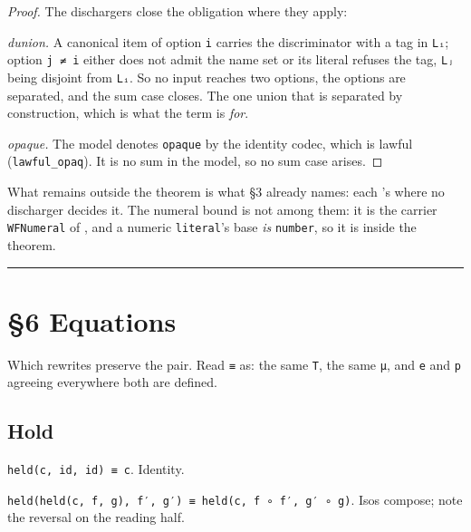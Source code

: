 \begin{proof}
The dischargers close the obligation where they apply:

\emph{dunion.} A canonical item of option \texttt{i} carries the discriminator with a tag in \texttt{Lᵢ}; option
\texttt{j\ ≠\ i} either does not admit the name set or its literal refuses the tag, \texttt{Lⱼ} being disjoint from
\texttt{Lᵢ}. So no input reaches two options, the options are separated, and the sum case closes. The one
union that is separated by construction, which is what the term is \emph{for}.

\emph{opaque.} The model denotes \texttt{opaque} by the identity codec, which is lawful
(\texttt{lawful\_opaq}). It is no sum in the model, so no sum case arises.
\end{proof}

What remains outside the theorem is what §3 already names: each 's  where no discharger decides it. The numeral bound is not among
them: it is the carrier \texttt{WFNumeral} of , and a numeric \texttt{literal}'s base \emph{is}
\texttt{number}, so it is inside the theorem.

\begin{center}\rule{0.5\linewidth}{0.5pt}\end{center}

\section{§6 Equations}\label{6-equations}

Which rewrites preserve the pair. Read \texttt{≡} as: the same \texttt{T}, the same \texttt{μ}, and \texttt{e} and \texttt{p} agreeing
everywhere both are defined.

\subsection{Hold}\label{hold}

\begin{theorem}[held(c, id, id) ≡ c]
\label{eq:held-id}
\leanok
\texttt{held(c,\ id,\ id)\ ≡\ c}. Identity.
\end{theorem}

\begin{theorem}
\label{eq:held-comp}
\leanok
\texttt{held(held(c,\ f,\ g),\ f′,\ g′)\ ≡\ held(c,\ f\ ∘\ f′,\ g′\ ∘\ g)}. Isos compose; note the
reversal on the reading half.
\end{theorem}

